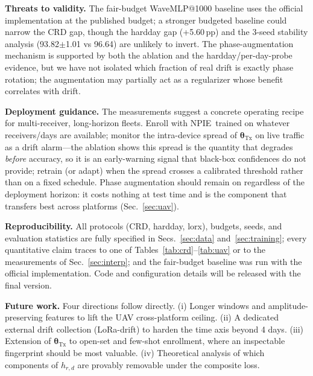 \documentclass[journal]{IEEEtran}
\newcommand{\npie}{\textsc{NPIE}}
\newcommand{\tx}{\boldsymbol{\theta}_{\mathrm{Tx}}}
\begin{document}
\textbf{Threats to validity.} The fair-budget WaveMLP@1000 baseline uses the official implementation at the published budget; a stronger budgeted baseline could narrow the CRD gap, though the hardday gap (+5.60\,pp) and the 3-seed stability analysis (93.82$\pm$1.01 vs 96.64) are unlikely to invert. The phase-augmentation mechanism is supported by both the ablation and the hardday/per-day-probe evidence, but we have not isolated which fraction of real drift is exactly phase rotation; the augmentation may partially act as a regularizer whose benefit correlates with drift.

\textbf{Deployment guidance.} The measurements suggest a concrete operating recipe for multi-receiver, long-horizon fleets. Enroll with \npie\ trained on whatever receivers/days are available; monitor the intra-device spread of $\tx$ on live traffic as a drift alarm---the ablation shows this spread is the quantity that degrades \emph{before} accuracy, so it is an early-warning signal that black-box confidences do not provide; retrain (or adapt) when the spread crosses a calibrated threshold rather than on a fixed schedule. Phase augmentation should remain on regardless of the deployment horizon: it costs nothing at test time and is the component that transfers best across platforms (Sec.~\ref{sec:uav}).

\textbf{Reproducibility.} All protocols (CRD, hardday, lorx), budgets, seeds, and evaluation statistics are fully specified in Secs.~\ref{sec:data} and~\ref{sec:training}; every quantitative claim traces to one of Tables~\ref{tab:crd}--\ref{tab:uav} or to the measurements of Sec.~\ref{sec:interp}; and the fair-budget baseline was run with the official implementation. Code and configuration details will be released with the final version.

\textbf{Future work.} Four directions follow directly. (i) Longer windows and amplitude-preserving features to lift the UAV cross-platform ceiling. (ii) A dedicated external drift collection (LoRa-drift) to harden the time axis beyond 4 days. (iii) Extension of $\tx$ to open-set and few-shot enrollment, where an inspectable fingerprint should be most valuable. (iv) Theoretical analysis of which components of $h_{r,d}$ are provably removable under the composite loss.

\end{document}
